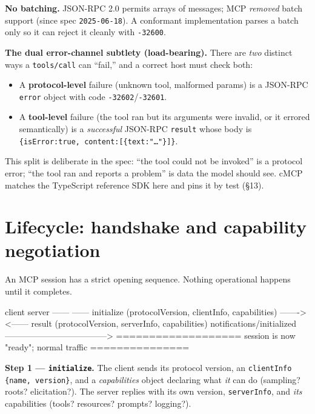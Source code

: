 \documentclass[10pt]{article}
\newcommand{\code}[1]{\texttt{\small #1}}
\begin{document}
\textbf{No batching.} JSON-RPC 2.0 permits arrays of messages; MCP \emph{removed}
batch support (since spec \code{2025-06-18}). A conformant implementation parses a
batch only so it can reject it cleanly with \code{-32600}.

\textbf{The dual error-channel subtlety (load-bearing).} There are \emph{two}
distinct ways a \code{tools/call} can ``fail,'' and a correct host must check
both:
\begin{itemize}
  \item A \textbf{protocol-level} failure (unknown tool, malformed params) is a
    JSON-RPC \code{error} object with code \code{-32602}/\code{-32601}.
  \item A \textbf{tool-level} failure (the tool ran but its arguments were
    invalid, or it errored semantically) is a \emph{successful} JSON-RPC
    \code{result} whose body is
    \code{\{isError:true, content:[\{text:"\dots"\}]\}}.
\end{itemize}
This split is deliberate in the spec: ``the tool could not be invoked'' is a
protocol error; ``the tool ran and reports a problem'' is data the model should
see. cMCP matches the TypeScript reference SDK here and pins it by test (\S13).

\section{Lifecycle: handshake and capability negotiation}

An MCP session has a strict opening sequence. Nothing operational happens until
it completes.

\begin{diag}
   client                                                          server
   ------                                                          ------
   initialize (protocolVersion, clientInfo, capabilities) ------->
                <------ result (protocolVersion, serverInfo, capabilities)
   notifications/initialized ------------------------------------>
   =================== session is now "ready"; normal traffic ===============
\end{diag}

\textbf{Step 1 --- \code{initialize}.} The client sends its protocol version, an
\code{clientInfo} \code{\{name, version\}}, and a \emph{capabilities} object
declaring what \emph{it} can do (sampling? roots? elicitation?). The server
replies with its own version, \code{serverInfo}, and \emph{its} capabilities
(tools? resources? prompts? logging?).
\end{document}
